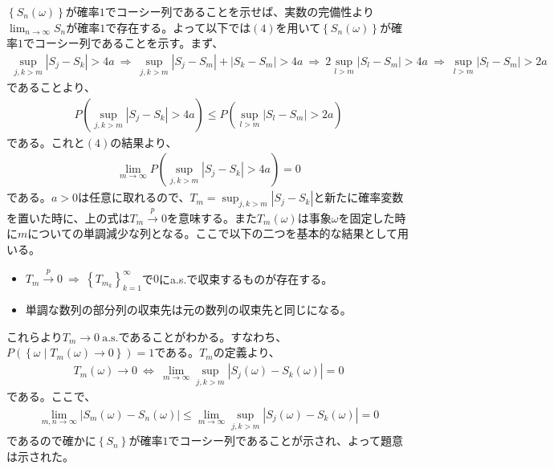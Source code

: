 \documentclass{article}
\begin{document}
$\left\{S_n(\omega)\right\}$が確率$1$でコーシー列であることを示せば、実数の完備性より$\lim_{n\to \infty} S_n$が確率$1$で存在する。よって以下では$(4)$を用いて$\left\{S_n(\omega)\right\}$が確率$1$でコーシー列であることを示す。まず、
\begin{align*}
	\sup_{j,k > m} \left| S_j - S_k \right| > 4a\ \Rightarrow\ \sup_{j,k > m} \left| S_j - S_m \right| + \left| S_k - S_m \right| > 4a\ \Rightarrow\ 2 \sup_{l > m} \left| S_l - S_m \right| > 4a\ \Rightarrow\ \sup_{l > m} \left| S_l - S_m \right| > 2a
\end{align*}
であることより、
\begin{align*}
	P\left( \sup_{j,k > m} \left| S_j - S_k \right| > 4a \right) \leq P\left( \sup_{l > m} \left| S_l - S_m \right| > 2a \right)
\end{align*}
である。これと$(4)$の結果より、
\begin{align*}
	\lim_{m \to \infty} P\left( \sup_{j,k > m} \left| S_j - S_k \right| > 4a \right) = 0
\end{align*}
である。$a > 0$は任意に取れるので、$T_m = \sup_{j,k > m} \left| S_j - S_k \right|$と新たに確率変数を置いた時に、上の式は$T_m \xrightarrow{p} 0$を意味する。また$T_m(\omega)$は事象$\omega$を固定した時に$m$についての単調減少な列となる。ここで以下の二つを基本的な結果として用いる。
\begin{itemize}
	\item $T_m \xrightarrow{p} 0\ \Rightarrow\ \left\{ T_{m_k} \right\}_{k=1}^{\infty}$で$0$にa.s.で収束するものが存在する。
	\item 単調な数列の部分列の収束先は元の数列の収束先と同じになる。
\end{itemize}
これらより$T_m \to 0\ \text{a.s.}$であることがわかる。すなわち、$P\left( \left\{ \omega\mid T_m(\omega) \to 0 \right\} \right) = 1$である。$T_m$の定義より、
\begin{align*}
	T_m(\omega) \to 0\ \Leftrightarrow\ \lim_{m\to \infty} \sup_{j,k > m} \left| S_j(\omega) - S_k(\omega) \right| = 0
\end{align*}
である。ここで、
\begin{align*}
	\lim_{m,n \to \infty} \left| S_m(\omega) - S_n(\omega) \right| \leq \lim_{m\to \infty} \sup_{j,k > m} \left| S_j(\omega) - S_k(\omega) \right| = 0
\end{align*}
であるので確かに$\left\{S_n\right\}$が確率$1$でコーシー列であることが示され、よって題意は示された。
\end{document}

